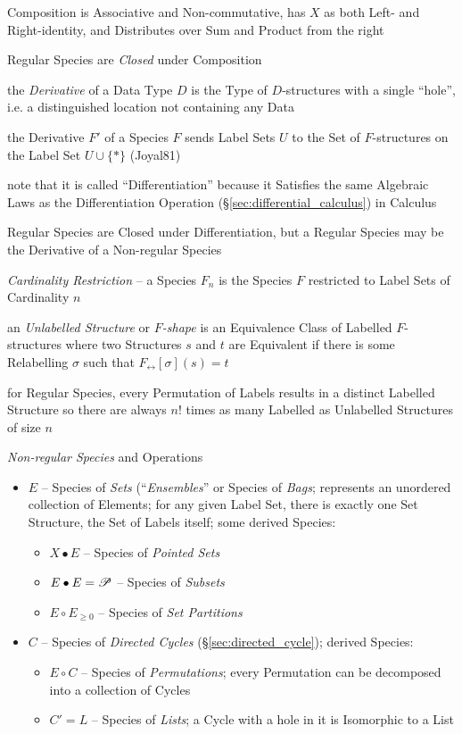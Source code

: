 Composition is Associative and Non-commutative, has $X$ as both Left- and
Right-identity, and Distributes over Sum and Product from the right

Regular Species are \emph{Closed} under Composition

the \emph{Derivative} of a Data Type $D$ is the Type of $D$-structures with a
single ``hole'', i.e. a distinguished location not containing any Data

the Derivative $F'$ of a Species $F$ sends Label Sets $U$ to the Set of
$F$-structures on the Label Set $U \cup \{*\}$ (Joyal81)

note that it is called ``Differentiation'' because it Satisfies the same
Algebraic Laws as the Differentiation Operation
(\S\ref{sec:differential_calculus}) in Calculus

Regular Species are Closed under Differentiation, but a Regular Species may be
the Derivative of a Non-regular Species

\emph{Cardinality Restriction} -- a Species $F_n$ is the Species $F$ restricted
to Label Sets of Cardinality $n$

an \emph{Unlabelled Structure} or \emph{$F$-shape} is an Equivalence Class of
Labelled $F$-structures where two Structures $s$ and $t$ are Equivalent if there
is some Relabelling $\sigma$ such that $F_\leftrightarrow[\sigma](s) = t$

for Regular Species, every Permutation of Labels results in a distinct Labelled
Structure so there are always $n!$ times as many Labelled as Unlabelled
Structures of size $n$

\emph{Non-regular Species} and Operations

\begin{itemize}
  \item $E$ -- Species of \emph{Sets} (``\emph{Ensembles}'' or Species of
    \emph{Bags}; represents an unordered collection of Elements; for any given
    Label Set, there is exactly one Set Structure, the Set of Labels itself;
    some derived Species:
    \begin{itemize}
      \item $X \bullet E$ -- Species of \emph{Pointed Sets}
      \item $E \bullet E = \mathscr{P}$ -- Species of \emph{Subsets}
      \item $E \circ E_{\geq0}$ -- Species of \emph{Set Partitions}
    \end{itemize}
  \item $C$ -- Species of \emph{Directed Cycles} (\S\ref{sec:directed_cycle});
    derived Species:
    \begin{itemize}
      \item $E \circ C$ -- Species of \emph{Permutations}; every Permutation can
        be decomposed into a collection of Cycles
      \item $C' = L$ -- Species of \emph{Lists}; a Cycle with a hole in it is
        Isomorphic to a List
    \end{itemize}
\end{itemize}

